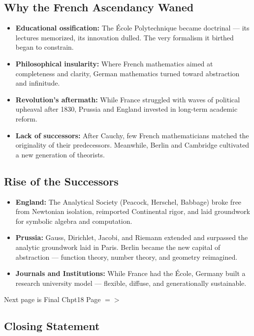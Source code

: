 \documentclass[9pt]{article}
\begin{document}
\subsection*{Why the French Ascendancy Waned}
\begin{itemize}
  \item \textbf{Educational ossification:} The École Polytechnique became doctrinal — its lectures memorized, its innovation dulled. The very formalism it birthed began to constrain.
  \item \textbf{Philosophical insularity:} Where French mathematics aimed at completeness and clarity, German mathematics turned toward abstraction and infinitude.
  \item \textbf{Revolution’s aftermath:} While France struggled with waves of political upheaval after 1830, Prussia and England invested in long-term academic reform.
  \item \textbf{Lack of successors:} After Cauchy, few French mathematicians matched the originality of their predecessors. Meanwhile, Berlin and Cambridge cultivated a new generation of theorists.
\end{itemize}

\subsection*{Rise of the Successors}
\begin{itemize}
  \item \textbf{England:} The Analytical Society (Peacock, Herschel, Babbage) broke free from Newtonian isolation, reimported Continental rigor, and laid groundwork for symbolic algebra and computation.
  \item \textbf{Prussia:} Gauss, Dirichlet, Jacobi, and Riemann extended and surpassed the analytic groundwork laid in Paris. Berlin became the new capital of abstraction — function theory, number theory, and geometry reimagined.
  \item \textbf{Journals and Institutions:} While France had the École, Germany built a research university model — flexible, diffuse, and generationally sustainable.
\end{itemize}

\vspace{1em}

\begin{center}
Next page is Final Chpt18 Page $=>$
\end{center}

\subsection{Closing Statement}
\end{document}
